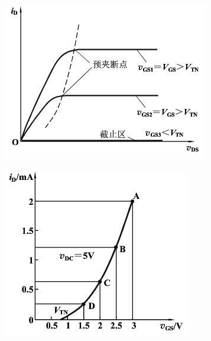 \begin{figure}[H]
  \centering
  \begin{subfigure}{.45\textwidth}
    \centering
    \includegraphics[width=\linewidth]{figures/ENMOSIV1}
  \end{subfigure}
  \begin{subfigure}{.5\textwidth}
    \centering
    \includegraphics[width=\linewidth]{figures/ENMOSIV2}
  \end{subfigure}
\end{figure}

